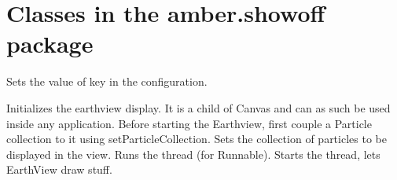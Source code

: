 \begin{classmetadata}
\end{classmetadata}

\begin{classinterface}
\end{classinterface}




\begin{classmetadata}
\end{classmetadata}

\begin{classinterface}
\end{classinterface}



\section{Classes in the amber.showoff package}


\begin{classmetadata}
\end{classmetadata}

\begin{classinterface}
    {Sets the value of key in the configuration.}
\end{classinterface}




\begin{classmetadata}
\end{classmetadata}

\begin{classinterface}
    {Initializes the earthview display. It is a child of Canvas and can as such
    be used inside any application. Before starting the Earthview, first couple
    a Particle collection to it using setParticleCollection.}
    {Sets the collection of particles to be displayed in the view.}
    {Runs the thread (for Runnable).}
    {Starts the thread, lets EarthView draw stuff.}
\end{classinterface}



